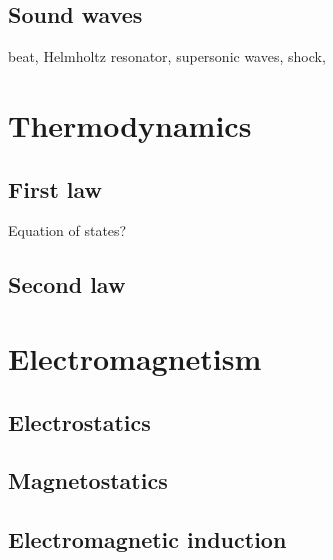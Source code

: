 \documentclass{../../large}
\begin{document}
\section{Sound waves}
\begin{prb}
\end{prb}
beat,
Helmholtz resonator,
supersonic waves,
shock,






\chapter{Thermodynamics}

\section{First law}
Equation of states?
\begin{prb}
\end{prb}
\begin{prb}
\end{prb}
\begin{prb}
\end{prb}

\section{Second law}
\begin{prb}[Entropy]
\end{prb}
\begin{prb}
\end{prb}






\chapter{Electromagnetism}
\section{Electrostatics}

\section{Magnetostatics}

\section{Electromagnetic induction}
\end{document}
